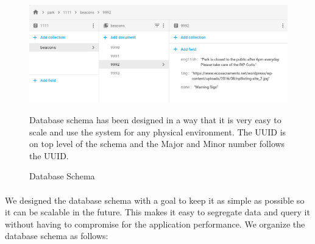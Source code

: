 \documentclass[12pt]{article}
\begin{document}
\begin{figure}[H]
	\centering
	\includegraphics[width=1\linewidth]{media/db.png}
	\caption{Database Schema}{Database schema has been designed in a way that it is very easy to scale and use the system for any physical environment. The UUID is on top level of the schema and the Major and Minor number follows the UUID. }
	\label{fig:db}
\end{figure} 

\paragraph{} We designed the database schema with a goal to keep it as simple as possible so it can be scalable in the future. This makes it easy to segregate data and query it without having to compromise for the application performance. We organize the database schema as follows:
\end{document}
